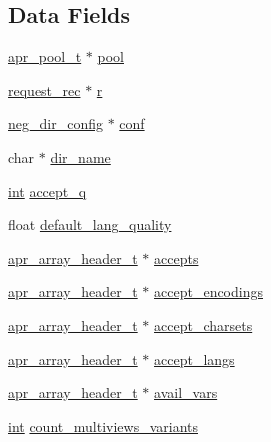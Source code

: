 \subsection*{Data Fields}
\begin{DoxyCompactItemize}
\item 
\hyperlink{structapr__pool__t}{apr\+\_\+pool\+\_\+t} $\ast$ \hyperlink{structnegotiation__state_a62acf45a4183d728d6e56adc6b35bea7}{pool}
\item 
\hyperlink{structrequest__rec}{request\+\_\+rec} $\ast$ \hyperlink{structnegotiation__state_acd85e7af2b58ffb04adfc4139e34e6c3}{r}
\item 
\hyperlink{structneg__dir__config}{neg\+\_\+dir\+\_\+config} $\ast$ \hyperlink{structnegotiation__state_aa6e27bb17567e0d28b4b3e7524995c6b}{conf}
\item 
char $\ast$ \hyperlink{structnegotiation__state_aeea465f8293c980269263308fc540cc4}{dir\+\_\+name}
\item 
\hyperlink{pcre_8txt_a42dfa4ff673c82d8efe7144098fbc198}{int} \hyperlink{structnegotiation__state_adc84ac85f5be2049db7d991aae058d86}{accept\+\_\+q}
\item 
float \hyperlink{structnegotiation__state_a19682e9aed43b8362149055fda6b6fdb}{default\+\_\+lang\+\_\+quality}
\item 
\hyperlink{structapr__array__header__t}{apr\+\_\+array\+\_\+header\+\_\+t} $\ast$ \hyperlink{structnegotiation__state_a90eaf99b333ce840f33483984f409b8b}{accepts}
\item 
\hyperlink{structapr__array__header__t}{apr\+\_\+array\+\_\+header\+\_\+t} $\ast$ \hyperlink{structnegotiation__state_ac95815749edf85bc8188bbf8945cb4ca}{accept\+\_\+encodings}
\item 
\hyperlink{structapr__array__header__t}{apr\+\_\+array\+\_\+header\+\_\+t} $\ast$ \hyperlink{structnegotiation__state_a06ce15ab1c57a71d51c06fab6c20a9c9}{accept\+\_\+charsets}
\item 
\hyperlink{structapr__array__header__t}{apr\+\_\+array\+\_\+header\+\_\+t} $\ast$ \hyperlink{structnegotiation__state_ae52b8a39bc73494011991f3c9f847231}{accept\+\_\+langs}
\item 
\hyperlink{structapr__array__header__t}{apr\+\_\+array\+\_\+header\+\_\+t} $\ast$ \hyperlink{structnegotiation__state_a9c89502c1d09fcde559b7d2965fde9d6}{avail\+\_\+vars}
\item 
\hyperlink{pcre_8txt_a42dfa4ff673c82d8efe7144098fbc198}{int} \hyperlink{structnegotiation__state_af617399d943c5dcda840d6d8a773616a}{count\+\_\+multiviews\+\_\+variants}

\end{DoxyCompactItemize}
